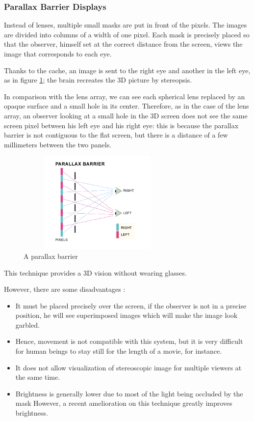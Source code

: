 \subsubsection{Parallax Barrier Displays}
Instead of lenses, multiple small masks are put in front of the pixels. The images are divided into columns of a width of one pixel.
Each mask is precisely placed so that the observer, himself set at the correct distance from the screen, views the image that corresponds to each eye. 

Thanks to the cache, an image is sent to the right eye and another in the left eye, as in figure \ref{fig:paraba}; the brain recreates the 3D picture by stereopsis.

In comparison with the lens array, we can see each spherical lens replaced by an opaque surface and a small hole in its center. Therefore, as in the case of the lens array, an observer looking at a small hole in the 3D screen does not see the same screen pixel between his left eye and his right eye: this is because the parallax barrier is not contiguous to the flat screen, but there is a distance of a few millimeters between the two panels.
\clearpage

\begin{figure}[h!]
\centering\includegraphics[width=8cm,height=5cm]{image/parallax.png}
\caption{A parallax barrier}
\label{fig:paraba}
\end{figure}

This technique provides a 3D vision without wearing glasses.

However, there are some disadvantages :
\begin{itemize}
\item It must be placed precisely over the screen, if the observer is not in a precise position, he will see superimposed images which will make the image look garbled.
\item Hence, movement is not compatible with this system, but it is very difficult for human beings to stay still for the length of a movie, for instance.
\item It does not allow visualization of stereoscopic image for multiple viewers at the same time.
\item Brightness is generally lower due to most of the light being occluded by the mask However, a recent amelioration on this technique greatly improves brightness\cite{lv2014shared}.
\end{itemize}

